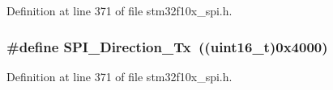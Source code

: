 Definition at line 371 of file stm32f10x\+\_\+spi.\+h.

\subsubsection[{\texorpdfstring{S\+P\+I\+\_\+\+Direction\+\_\+\+Tx}{SPI_Direction_Tx}}]{\setlength{\rightskip}{0pt plus 5cm}\#define S\+P\+I\+\_\+\+Direction\+\_\+\+Tx~(({\bf uint16\+\_\+t})0x4000)}\hypertarget{group___s_p_i__direction__transmit__receive_gabd76982a7e305c13f7ad8ea1789d3c0c}{}\label{group___s_p_i__direction__transmit__receive_gabd76982a7e305c13f7ad8ea1789d3c0c}


Definition at line 371 of file stm32f10x\+\_\+spi.\+h.

